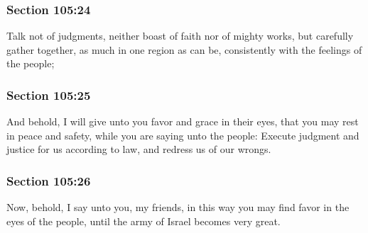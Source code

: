 	\subsubsection{Section 105:24} %
		\label{DC105-24}

		Talk not of judgments, neither boast of faith nor of mighty works, but carefully gather together, as much in one region as can be, consistently with the feelings of the people;


	\subsubsection{Section 105:25} %
		\label{DC105-25}

		And behold, I will give unto you favor and grace in their eyes, that you may rest in peace and safety, while you are saying unto the people: Execute judgment and justice for us according to law, and redress us of our wrongs.


	\subsubsection{Section 105:26} %
		\label{DC105-26}

		Now, behold, I say unto you, my friends, in this way you may find favor in the eyes of the people, until the army of Israel becomes very great.


